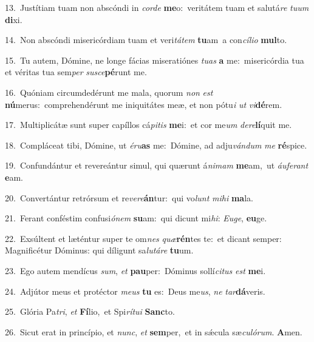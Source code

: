 {\numbfont\textcolor{\numbcolor}{13.}}~Justítiam tuam non abscóndi in \textit{cor}\-\textit{de} \textbf{me}\-o:~\star veritátem tuam et salutá\textit{re} \textit{tu}\-\textit{um} \textbf{di}\-xi.\par
{\numbfont\textcolor{\numbcolor}{14.}}~Non abscóndi misericórdiam tuam et veri\-\textit{tá}\-\textit{tem} \textbf{tu}\-am~\star a con\-\textit{cí}\-\textit{li}\textit{o} \textbf{mul}\-to.\par
{\numbfont\textcolor{\numbcolor}{15.}}~Tu autem, Dómine, ne longe fácias miseratiónes \textit{tu}\-\textit{as} \textbf{a} me:~\star misericórdia tua et véritas tua sem\textit{per} \textit{su}\-\textit{sce}\textbf{pé}runt me.\par
{\numbfont\textcolor{\numbcolor}{16.}}~Quóniam circumdedérunt me mala, quorum \textit{non} \textit{est} \textbf{nú}\-merus:~\star comprehendérunt me iniquitátes meæ, et non pótu\textit{i} \textit{ut} \textit{vi}\-\textbf{dé}rem.\par
{\numbfont\textcolor{\numbcolor}{17.}}~Multiplicátæ sunt super capíllos cá\-\textit{pi}\-\textit{tis} \textbf{me}\-i:~\star et cor me\textit{um} \textit{de}\-\textit{re}\textbf{lí}quit me.\par
{\numbfont\textcolor{\numbcolor}{18.}}~Compláceat tibi, Dómine, ut \textit{é}\-\textit{ru}\textbf{as} me:~\star Dómine, ad adju\-\textit{ván}\-\textit{dum} \textit{me} \textbf{ré}\-spice.\par
{\numbfont\textcolor{\numbcolor}{19.}}~Confundántur et revereántur simul, qui quærunt á\-\textit{ni}\-\textit{mam} \textbf{me}\-am,~\star ut \textit{áu}\-\textit{fe}\textit{rant} \textbf{e}\-am.\par
{\numbfont\textcolor{\numbcolor}{20.}}~Convertántur retrórsum et re\-\textit{ve}\-\textit{re}\textbf{án}tur:~\star qui vo\textit{lunt} \textit{mi}\-\textit{hi} \textbf{ma}\-la.\par
{\numbfont\textcolor{\numbcolor}{21.}}~Ferant conféstim confusi\-\textit{ó}\-\textit{nem} \textbf{su}\-am:~\star qui dicunt mi\-\textit{hi}\-: \textit{Eu}\-\textit{ge}, \textbf{eu}\-ge.\par
{\numbfont\textcolor{\numbcolor}{22.}}~Exsúltent et læténtur super te om\textit{nes} \textit{quæ}\-\textbf{rén}tes te:~\star et dicant semper: Magnificétur Dóminus: qui díligunt sa\-\textit{lu}\-\textit{tá}\textit{re} \textbf{tu}\-um.\par
{\numbfont\textcolor{\numbcolor}{23.}}~Ego autem mendícus \textit{sum}\-, \textit{et} \textbf{pau}\-per:~\star Dóminus sollí\-\textit{ci}\-\textit{tus} \textit{est} \textbf{me}\-i.\par
{\numbfont\textcolor{\numbcolor}{24.}}~Adjútor meus et protéctor \textit{me}\-\textit{us} \textbf{tu} es:~\star Deus me\-\textit{us}\-, \textit{ne} \textit{tar}\-\textbf{dá}veris.\par
{\numbfont\textcolor{\numbcolor}{25.}}~Glória Pa\-\textit{tri}\-, \textit{et} \textbf{Fí}\-lio,~\star et Spi\-\textit{rí}\-\textit{tu}\textit{i} \textbf{Sanc}\-to.\par
{\numbfont\textcolor{\numbcolor}{26.}}~Sicut erat in princípio, et \textit{nunc}\-, \textit{et} \textbf{sem}\-per,~\star et in sǽcula sæ\-\textit{cu}\-\textit{ló}\textit{rum}. \textbf{A}\-men.\par
